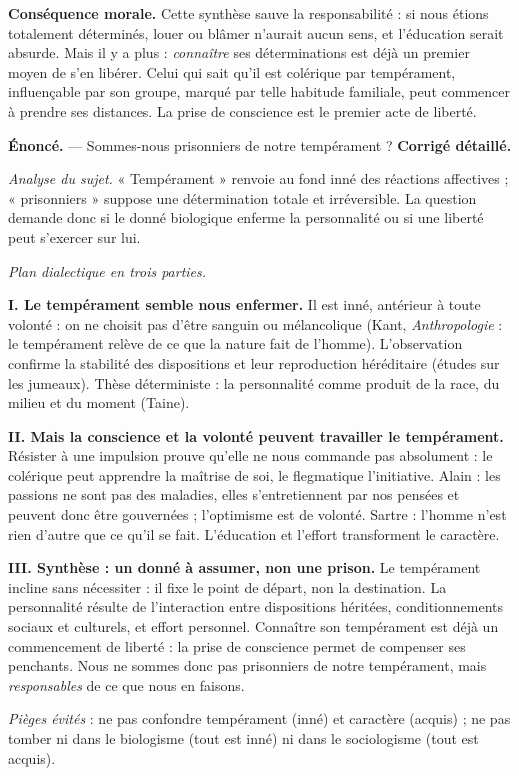 \documentclass[11pt]{article}
\newcommand{\cle}[1]{{\popxbold\color{popdark}#1}}
\begin{document}
\textbf{Conséquence morale.} Cette synthèse sauve la \cle{responsabilité} : si nous étions totalement déterminés, louer ou blâmer n'aurait aucun sens, et l'éducation serait absurde. Mais il y a plus : \emph{connaître} ses déterminations est déjà un premier moyen de s'en libérer. Celui qui sait qu'il est colérique par tempérament, influençable par son groupe, marqué par telle habitude familiale, peut commencer à prendre ses distances. La prise de conscience est le premier acte de liberté.

\begin{exoresolu}
\textbf{Énoncé.} — Sommes-nous prisonniers de notre tempérament ?
\tcblower
\textbf{Corrigé détaillé.}

\emph{Analyse du sujet.} « Tempérament » renvoie au fond inné des réactions affectives ; « prisonniers » suppose une détermination totale et irréversible. La question demande donc si le donné biologique enferme la personnalité ou si une liberté peut s'exercer sur lui.

\emph{Plan dialectique en trois parties.}

\textbf{I. Le tempérament semble nous enfermer.} Il est inné, antérieur à toute volonté : on ne choisit pas d'être sanguin ou mélancolique (Kant, \emph{Anthropologie} : le tempérament relève de ce que la nature fait de l'homme). L'observation confirme la stabilité des dispositions et leur reproduction héréditaire (études sur les jumeaux). Thèse déterministe : la personnalité comme produit de la race, du milieu et du moment (Taine).

\textbf{II. Mais la conscience et la volonté peuvent travailler le tempérament.} Résister à une impulsion prouve qu'elle ne nous commande pas absolument : le colérique peut apprendre la maîtrise de soi, le flegmatique l'initiative. Alain : les passions ne sont pas des maladies, elles s'entretiennent par nos pensées et peuvent donc être gouvernées ; l'optimisme est de volonté. Sartre : l'homme n'est rien d'autre que ce qu'il se fait. L'éducation et l'effort transforment le caractère.

\textbf{III. Synthèse : un donné à assumer, non une prison.} Le tempérament incline sans nécessiter : il fixe le point de départ, non la destination. La personnalité résulte de l'interaction entre dispositions héritées, conditionnements sociaux et culturels, et effort personnel. Connaître son tempérament est déjà un commencement de liberté : la prise de conscience permet de compenser ses penchants. Nous ne sommes donc pas prisonniers de notre tempérament, mais \emph{responsables} de ce que nous en faisons.

\emph{Pièges évités} : ne pas confondre tempérament (inné) et caractère (acquis) ; ne pas tomber ni dans le biologisme (tout est inné) ni dans le sociologisme (tout est acquis).
\end{exoresolu}
\end{document}
